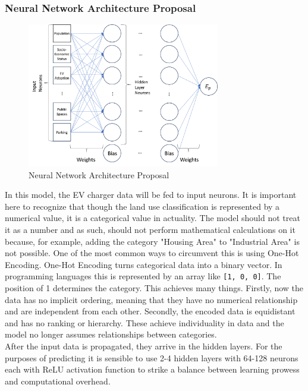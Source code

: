 \subsubsection{Neural Network Architecture Proposal}\label{sec:proposal}
\begin{figure}[H]
\begin{center}
\includegraphics[width=0.75\textwidth]{Bilder/sdfgsgdfg.png}
\caption{ Neural Network Architecture Proposal}\label{fig:neuraldraft}
\end{center}
\end{figure}
In this model, the EV charger data will be fed to input neurons. It is important here to recognize that though the land use classification is represented by a numerical value, it is a categorical value in actuality. The model should not treat it as a number and as such, should not perform mathematical calculations on it because, for example, adding the category "Housing Area" to "Industrial Area" is not possible. One of the most common ways to circumvent this is using One-Hot Encoding. One-Hot Encoding turns categorical data into a binary vector. In programming languages this is represented by an array like \verb|[1, 0, 0]|. The position of 1 determines the category. This achieves many things. Firstly, now the data has no implicit ordering, meaning that they have no numerical relationship and are independent from each other. Secondly, the encoded data is equidistant and has no ranking or hierarchy. These achieve individuality in data and the model no longer assumes relationships between categories.\\
After the input data is propagated, they arrive in the hidden layers. For the purposes of predicting it is sensible to use 2-4 hidden layers with 64-128 neurons each with \gls{ReLU} activation function to strike a balance between learning prowess and computational overhead.\\
